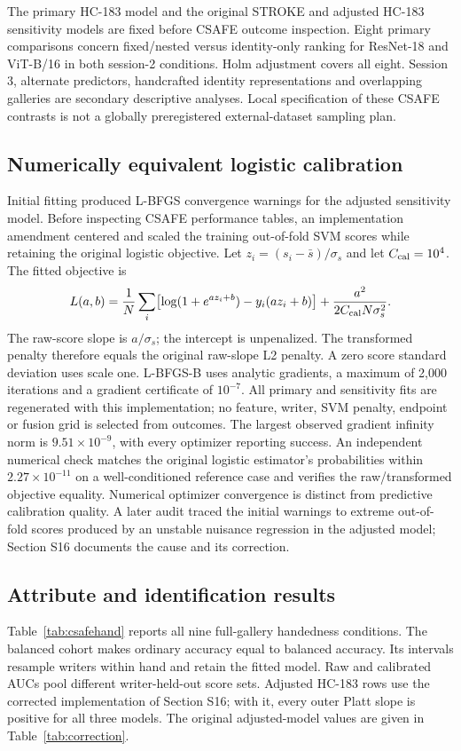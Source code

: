 \documentclass[10pt,a4paper]{article}
\begin{document}
The primary HC-183 model and the original STROKE and adjusted HC-183 sensitivity models are fixed before CSAFE outcome inspection. Eight primary comparisons concern fixed/nested versus identity-only ranking for ResNet-18 and ViT-B/16 in both session-2 conditions. Holm adjustment covers all eight. Session 3, alternate predictors, handcrafted identity representations and overlapping galleries are secondary descriptive analyses. Local specification of these CSAFE contrasts is not a globally preregistered external-dataset sampling plan.

\subsection{Numerically equivalent logistic calibration}
Initial fitting produced L-BFGS convergence warnings for the adjusted sensitivity model. Before inspecting CSAFE performance tables, an implementation amendment centered and scaled the training out-of-fold SVM scores while retaining the original logistic objective. Let $z_i=(s_i-\bar s)/\sigma_s$ and let $C_{\rm cal}=10^4$. The fitted objective is
\begin{equation}
L(a,b)=\frac1N\sum_i\bigl[\log(1+e^{a z_i+b})-y_i(a z_i+b)\bigr]+\frac{a^2}{2C_{\rm cal}N\sigma_s^2}.
\label{eq:csafecalibration}
\end{equation}
The raw-score slope is $a/\sigma_s$; the intercept is unpenalized. The transformed penalty therefore equals the original raw-slope L2 penalty. A zero score standard deviation uses scale one. L-BFGS-B uses analytic gradients, a maximum of 2,000 iterations and a gradient certificate of $10^{-7}$. All primary and sensitivity fits are regenerated with this implementation; no feature, writer, SVM penalty, endpoint or fusion grid is selected from outcomes. The largest observed gradient infinity norm is $9.51\times10^{-9}$, with every optimizer reporting success. An independent numerical check matches the original logistic estimator's probabilities within $2.27\times10^{-11}$ on a well-conditioned reference case and verifies the raw/transformed objective equality. Numerical optimizer convergence is distinct from predictive calibration quality. A later audit traced the initial warnings to extreme out-of-fold scores produced by an unstable nuisance regression in the adjusted model; Section S16 documents the cause and its correction.

\subsection{Attribute and identification results}
Table~\ref{tab:csafehand} reports all nine full-gallery handedness conditions. The balanced cohort makes ordinary accuracy equal to balanced accuracy. Its intervals resample writers within hand and retain the fitted model. Raw and calibrated AUCs pool different writer-held-out score sets. Adjusted HC-183 rows use the corrected implementation of Section S16; with it, every outer Platt slope is positive for all three models. The original adjusted-model values are given in Table~\ref{tab:correction}.
\end{document}
